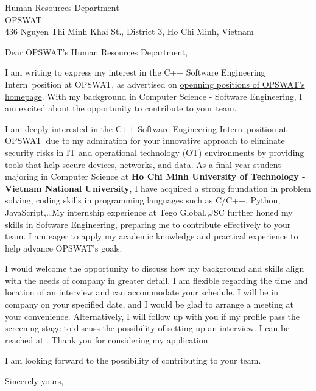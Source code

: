 \documentclass[
	parskip=half, %
	enlargefirstpage=true, %
]{scrlttr2} %
\newcommand{\TOHRNAME}{}
\newcommand{\TOPOSITION}{Human Resources Department}
\newcommand{\TOCOMPANY}{OPSWAT}
\newcommand{\TOLOCATION}{436 Nguyen Thi Minh Khai St., District 3, Ho Chi Minh, Vietnam}
\newcommand{\COMPANYSERVICE}{eliminate security risks in IT and operational technology (OT) environments by providing tools that help secure devices, networks, and data}
\newcommand{\JOBTITLE}{C++ Software Engineering Intern}
\newcommand{\COMPANY}{\TOCOMPANY}
\newcommand{\JOBBOARD}{\href{https://www.opswat.com/jobs/4479730005}{openning positions of OPSWAT's homepage}}
\newcommand{\MYFIELD}{Computer Science - Software Engineering}
\begin{document}

\begin{letter}{
	\TOPOSITION \\
	\TOCOMPANY \\
	\TOLOCATION
}

\opening{Dear \TOCOMPANY's \TOPOSITION,}

I am writing to express my interest in the \JOBTITLE\ position at \COMPANY, as advertised on \JOBBOARD. With my background in \MYFIELD, I am excited about the opportunity to contribute to your team.

I am deeply interested in the \JOBTITLE\ position at \COMPANY\ due to my admiration for your innovative approach to \COMPANYSERVICE. As a final-year student majoring in Computer Science at \textbf{Ho Chi Minh University of Technology - Vietnam National University}, I have acquired a strong foundation in problem solving, coding skills in programming languages such as C/C++, Python, JavaScript,\dots\. My internship experience at Tego Global.,JSC further honed my skills in Software Engineering, preparing me to contribute effectively to your team. I am eager to apply my academic knowledge and practical experience to help advance \COMPANY's goals.

I would welcome the opportunity to discuss how my background and skills align with the needs of company in greater detail. I am flexible regarding the time and location of an interview and can accommodate your schedule. I will be in company on your specified date, and I would be glad to arrange a meeting at your convenience. Alternatively, I will follow up with you if my profile pass the screening stage to discuss the possibility of setting up an interview. I can be reached at . Thank you for considering my application.

I am looking forward to the possibility of contributing to your team.

Sincerely yours, \\


\end{letter}
\end{document}
